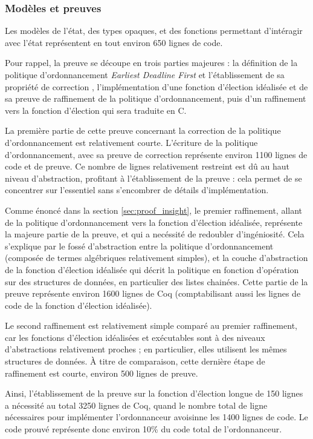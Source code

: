			\subsubsection{Modèles et preuves}
			
			Les modèles de l'état, des types opaques, et des fonctions permettant d'intéragir avec l'état représentent en tout environ 650 lignes de code.

			Pour rappel, la preuve se découpe en trois parties majeures : la définition de la politique d'ordonnancement \emph{Earliest Deadline First} et l'établissement de sa propriété de correction , l'implémentation d'une fonction d'élection idéalisée et de sa preuve de raffinement de la politique d'ordonnancement, puis d'un raffinement vers la fonction d'élection qui sera traduite en C.

			La première partie de cette preuve concernant la correction de la politique d'ordonnancement est relativement courte. L'écriture de la politique d'ordonnancement, avec sa preuve de correction représente environ 1100 lignes de code et de preuve. Ce nombre de lignes relativement restreint est dû au haut niveau d'abstraction, profitant à l'établissement de la preuve : cela permet de se concentrer sur l'essentiel sans s'encombrer de détails d'implémentation.
		
			Comme énoncé dans la section \ref{sec:proof_insight}, le premier raffinement, allant de la politique d'ordonnancement vers la fonction d'élection idéalisée, représente la majeure partie de la preuve, et qui a necéssité de redoubler d'ingéniosité. Cela s'explique par le fossé d'abstraction entre la politique d'ordonnancement (composée de termes algébriques relativement simples), et la couche d'abstraction de la fonction d'élection idéalisée qui décrit la politique en fonction d'opération sur des structures de données, en particulier des listes chainées. Cette partie de la preuve représente environ 1600 lignes de Coq (comptabilisant aussi les lignes de code de la fonction d'élection idéalisée).

			Le second raffinement est relativement simple comparé au premier raffinement, car les fonctions d'élection idéalisées et exécutables sont à des niveaux d'abstractions relativement proches ; en particulier, elles utilisent les mêmes structures de données. À titre de comparaison, cette dernière étape de raffinement est courte, environ 500 lignes de preuve.

			Ainsi, l'établissement de la preuve sur la fonction d'élection longue de 150 lignes a nécessité au total 3250 lignes de Coq, quand le nombre total de ligne nécessaires pour implémenter l'ordonnanceur avoisinne les 1400 lignes de code. Le code prouvé représente donc environ 10\% du code total de l'ordonnanceur.


